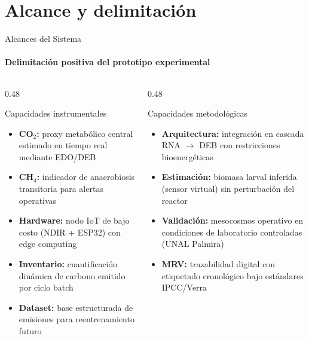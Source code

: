\documentclass[aspectratio=169, 11pt]{beamer}
\begin{document}
\section{Alcance y delimitación}
\begin{frame}{Alcances del Sistema}
\framesubtitle{Delimitación positiva del prototipo experimental}

\begin{columns}[T,onlytextwidth]

\begin{column}{0.48\textwidth}

\begin{block}{Capacidades instrumentales}
\scriptsize
\begin{itemize}
    \item \textbf{CO$_2$:} proxy metabólico central estimado en tiempo real mediante EDO/DEB
    \item \textbf{CH$_4$:} indicador de anaerobiosis transitoria para alertas operativas
    \item \textbf{Hardware:} nodo IoT de bajo costo (NDIR + ESP32) con edge computing
    \item \textbf{Inventario:} cuantificación dinámica de carbono emitido por ciclo batch
    \item \textbf{Dataset:} base estructurada de emisiones para reentrenamiento futuro
\end{itemize}
\end{block}

\end{column}

\begin{column}{0.48\textwidth}

\begin{block}{Capacidades metodológicas}
\scriptsize
\begin{itemize}
    \item \textbf{Arquitectura:} integración en cascada RNA $\rightarrow$ DEB con restricciones bioenergéticas
    \item \textbf{Estimación:} biomasa larval inferida (sensor virtual) sin perturbación del reactor
    \item \textbf{Validación:} mesocosmos operativo en condiciones de laboratorio controladas (UNAL Palmira)
    \item \textbf{MRV:} trazabilidad digital con etiquetado cronológico bajo estándares IPCC/Verra
\end{itemize}
\end{block}

\end{column}

\end{columns}
\end{frame}
\end{document}
